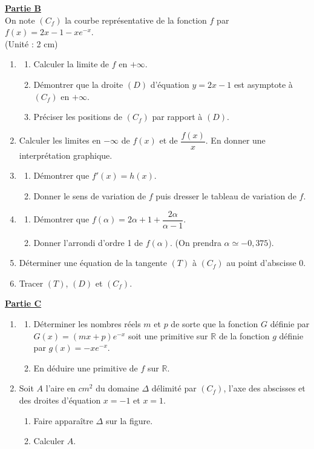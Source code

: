 \documentclass[12pt,a4paper]{article}
\begin{document}
\noindent \underline{\textbf{Partie B}} \\
On note $(C_f)$ la courbe représentative de la fonction $f$ par $f(x) = 2x - 1 - xe^{-x}$. \\
(Unité : 2 cm)
\begin{enumerate}
    \item \begin{enumerate}
        \item Calculer la limite de $f$ en $+\infty$.
        \item Démontrer que la droite $(D)$ d'équation $y = 2x - 1$ est asymptote à $(C_f)$ en $+\infty$.
        \item Préciser les positions de $(C_f)$ par rapport à $(D)$.
    \end{enumerate}
    \item Calculer les limites en $-\infty$ de $f(x)$ et de $\dfrac{f(x)}{x}$. En donner une interprétation graphique.
    \item \begin{enumerate}
        \item Démontrer que $f'(x) = h(x)$.
        \item Donner le sens de variation de $f$ puis dresser le tableau de variation de $f$.
    \end{enumerate}
    \item \begin{enumerate}
        \item Démontrer que $f(\alpha) = 2\alpha + 1 + \dfrac{2\alpha}{\alpha - 1}$.
        \item Donner l'arrondi d'ordre 1 de $f(\alpha)$. (On prendra $\alpha \simeq -0,375$).
    \end{enumerate}
    \item Déterminer une équation de la tangente $(T)$ à $(C_f)$ au point d'abscisse 0.
    \item Tracer $(T)$, $(D)$ et $(C_f)$.
\end{enumerate}

\vspace{0.5cm}

\noindent \underline{\textbf{Partie C}}
\begin{enumerate}
    \item \begin{enumerate}
        \item Déterminer les nombres réels $m$ et $p$ de sorte que la fonction $G$ définie par $G(x) = (mx + p)e^{-x}$ soit une primitive sur $\mathbb{R}$ de la fonction $g$ définie par $g(x) = -xe^{-x}$.
        \item En déduire une primitive de $f$ sur $\mathbb{R}$.
    \end{enumerate}
    \item Soit $A$ l'aire en $cm^2$ du domaine $\Delta$ délimité par $(C_f)$, l'axe des abscisses et des droites d'équation $x = -1$ et $x = 1$.
    \begin{enumerate}
        \item Faire apparaître $\Delta$ sur la figure.
        \item Calculer $A$.
    \end{enumerate}
\end{enumerate}
\end{document}
